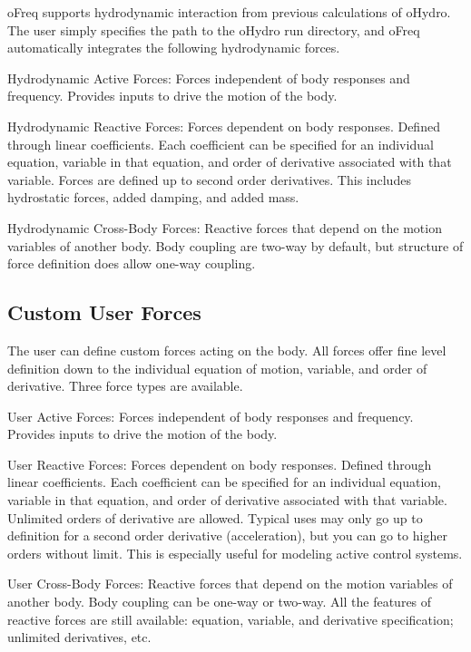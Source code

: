 o\-Freq supports hydrodynamic interaction from previous calculations of o\-Hydro. The user simply specifies the path to the o\-Hydro run directory, and o\-Freq automatically integrates the following hydrodynamic forces.


\begin{DoxyItemize}
\item Hydrodynamic Active Forces\-: Forces independent of body responses and frequency. Provides inputs to drive the motion of the body.
\item Hydrodynamic Reactive Forces\-: Forces dependent on body responses. Defined through linear coefficients. Each coefficient can be specified for an individual equation, variable in that equation, and order of derivative associated with that variable. Forces are defined up to second order derivatives. This includes hydrostatic forces, added damping, and added mass.
\item Hydrodynamic Cross-\/\-Body Forces\-: Reactive forces that depend on the motion variables of another body. Body coupling are two-\/way by default, but structure of force definition does allow one-\/way coupling.
\end{DoxyItemize}

\subsection*{Custom User Forces}

The user can define custom forces acting on the body. All forces offer fine level definition down to the individual equation of motion, variable, and order of derivative. Three force types are available.


\begin{DoxyItemize}
\item User Active Forces\-: Forces independent of body responses and frequency. Provides inputs to drive the motion of the body.
\item User Reactive Forces\-: Forces dependent on body responses. Defined through linear coefficients. Each coefficient can be specified for an individual equation, variable in that equation, and order of derivative associated with that variable. Unlimited orders of derivative are allowed. Typical uses may only go up to definition for a second order derivative (acceleration), but you can go to higher orders without limit. This is especially useful for modeling active control systems.
\item User Cross-\/\-Body Forces\-: Reactive forces that depend on the motion variables of another body. Body coupling can be one-\/way or two-\/way. All the features of reactive forces are still available\-: equation, variable, and derivative specification; unlimited derivatives, etc.
\end{DoxyItemize}

